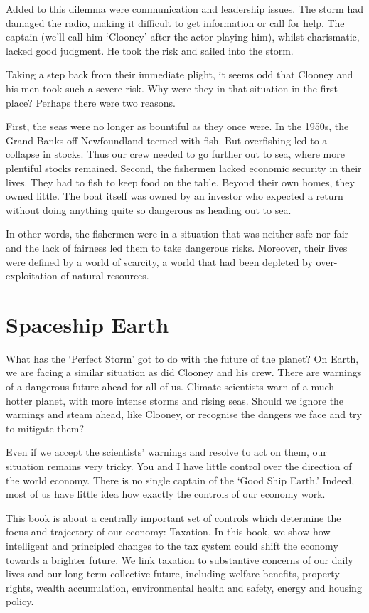 \documentclass[]{tufte-handout}
\begin{document}
Added to this dilemma were communication and leadership issues. The
storm had damaged the radio, making it difficult to get information or
call for help. The captain (we'll call him `Clooney' after the actor
playing him), whilst charismatic, lacked good judgment. He took the risk
and sailed into the storm.

Taking a step back from their immediate plight, it seems odd that
Clooney and his men took such a severe risk. Why were they in that
situation in the first place? Perhaps there were two reasons.

First, the seas were no longer as bountiful as they once were. In the
1950s, the Grand Banks off Newfoundland teemed with fish. But
overfishing led to a collapse in stocks. Thus our crew needed to go
further out to sea, where more plentiful stocks remained. Second, the
fishermen lacked economic security in their lives. They had to fish to
keep food on the table. Beyond their own homes, they owned little. The
boat itself was owned by an investor who expected a return without doing
anything quite so dangerous as heading out to sea.

In other words, the fishermen were in a situation that was neither safe
nor fair - and the lack of fairness led them to take dangerous risks.
Moreover, their lives were defined by a world of scarcity, a world that
had been depleted by over-exploitation of natural resources.

\hypertarget{spaceship-earth}{%
\section{Spaceship Earth}\label{spaceship-earth}}

What has the `Perfect Storm' got to do with the future of the planet? On
Earth, we are facing a similar situation as did Clooney and his crew.
There are warnings of a dangerous future ahead for all of us. Climate
scientists warn of a much hotter planet, with more intense storms and
rising seas. Should we ignore the warnings and steam ahead, like
Clooney, or recognise the dangers we face and try to mitigate them?

Even if we accept the scientists' warnings and resolve to act on them,
our situation remains very tricky. You and I have little control over
the direction of the world economy. There is no single captain of the
`Good Ship Earth.' Indeed, most of us have little idea how exactly the
controls of our economy work.

This book is about a centrally important set of controls which determine
the focus and trajectory of our economy: Taxation. In this book, we show
how intelligent and principled changes to the tax system could shift the
economy towards a brighter future. We link taxation to substantive
concerns of our daily lives and our long-term collective future,
including welfare benefits, property rights, wealth accumulation,
environmental health and safety, energy and housing policy.
\end{document}
